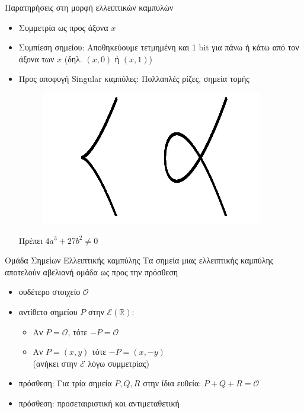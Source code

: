 \documentclass[handout]{beamer}
\begin{document}
\begin{frame}{Παρατηρήσεις στη μορφή ελλειπτικών καμπυλών}

\begin{itemize}
\item Συμμετρία ως προς άξονα $x$ \pause
\item Συμπίεση σημείου: Αποθηκεύουμε τετμημένη και 1 bit για πάνω ή κάτω από τον άξονα των $x$ (δηλ.  $(x,0)$ ή $(x,1)$) \pause
  
\item \alert{Προς αποφυγή} Singular καμπύλες: Πολλαπλές ρίζες, σημεία τομής \\

\begin{figure}
\includegraphics[scale=0.3]{singular.png}
\end{figure}
Πρέπει $4a^3+27b^2 \neq 0$
\end{itemize}
\end{frame}

\begin{frame}{Ομάδα Σημείων Ελλειπτικής καμπύλης}
	Τα σημεία μιας ελλειπτικής καμπύλης αποτελούν αβελιανή ομάδα ως προς την πρόσθεση \pause
	\begin{itemize}
	\item ουδέτερο στοιχείο $\mathcal{O}$ \pause
	\item αντίθετο σημείου $P$ στην $\mathcal E(\mathbb{R})$:
	\begin{itemize}
		\item Αν $P=\mathcal O$, τότε  $-P=\mathcal O$
		\item Αν $P=(x,y)$ τότε $-P=(x,-y)$ \\(ανήκει στην $\mathcal E$ λόγω συμμετρίας)
	\end{itemize} \pause
	\item πρόσθεση: Για τρία σημεία $P,Q,R$ στην ίδια ευθεία: $P+Q+R=\mathcal O$
	\item πρόσθεση: προσεταιριστική και αντιμεταθετική
	\end{itemize}
\end{frame} 
\end{document}
